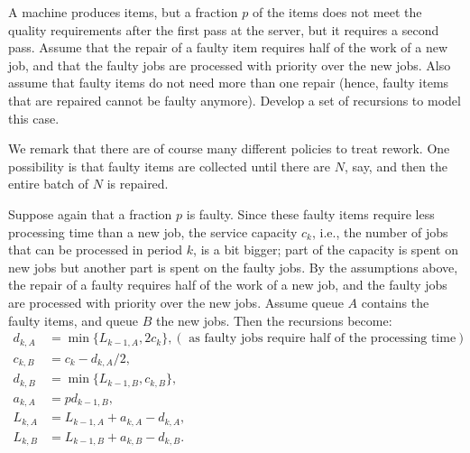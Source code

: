 \begin{extra}[Rework] \label{ex:52}

  A machine produces items, but a fraction $p$ of the items does not meet the quality requirements after the first pass at the server, but it requires a second pass.
  Assume that the repair of a faulty item requires half of the work of a new job, and that the faulty jobs are processed with priority over the new jobs.
  Also assume that faulty items do not need more than one repair (hence, faulty items that are repaired cannot be faulty anymore).
  Develop a set of recursions to model this case.


  We remark that there are of course many different policies to treat rework.
  One possibility is that faulty items are collected until there are $N$, say, and then the entire batch of $N$ is repaired.
\begin{solution}
    Suppose again that a fraction $p$ is faulty. Since these faulty
    items require less processing time than a new job, the service
    capacity $c_k$, i.e., the number of jobs that can be processed in
    period $k$, is a bit bigger; part of the capacity is spent on new
    jobs but another part is spent on the faulty jobs. By the
    assumptions above, the repair of a faulty requires half of the
    work of a new job, and the faulty jobs are processed with priority
    over the new jobs. Assume queue $A$ contains the faulty items, and
    queue $B$ the new jobs. Then the recursions become:
\begin{equation*}
  \begin{split}
    d_{k,A} &= \min\{L_{k-1, A}, 2c_k\}, (\text{ as faulty jobs require half of the processing time})\\
    c_{k,B} &= c_k - d_{k,A}/2, \\
    d_{k,B} &= \min\{L_{k-1, B}, c_{k,B}\}, \\
    a_{k,A} &= p d_{k-1, B}, \\
    L_{k,A} &= L_{k-1, A} + a_{k,A} - d_{k,A}, \\
    L_{k,B} &= L_{k-1, B} + a_{k,B} - d_{k,B}.
  \end{split}
\end{equation*}
\end{solution}
\end{extra}


